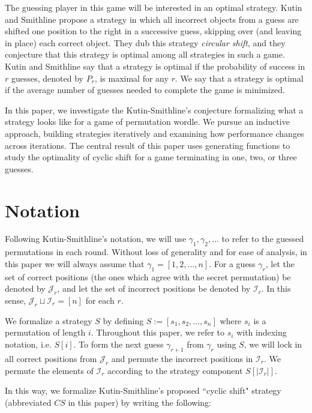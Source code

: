 \documentclass[article]{amsart}
\theoremstyle{definition}
\theoremstyle{definition}
\theoremstyle{remark}
\begin{document}
The guessing player in this game will be interested in an optimal strategy. Kutin and Smithline propose a strategy in which all incorrect objects from a guess are shifted one position to the right in a successive guess, skipping over (and leaving in place) each correct object. They dub this strategy \textit{circular shift}, and they conjecture that this strategy is optimal among all strategies in such a game. Kutin and Smithline say that a strategy is optimal if the probability of success in $r$ guesses, denoted by $P_r$, is maximal for any $r$. We say that a strategy is optimal if the average number of guesses needed to complete the game is minimized.

In this paper, we investigate the Kutin-Smithline's conjecture formalizing what a strategy looks like for a game of permutation wordle. We pursue an inductive approach, building strategies iteratively and examining how performance changes across iterations. The central result of this paper uses generating functions to study the optimality of cyclic shift for a game terminating in one, two, or three guesses.



\section{Notation} \label{sec:not}
Following Kutin-Smithline's notation, we will use $\gamma_1, \gamma_2, \dots $ to refer to the guessed permutations in each round. Without loss of generality and for ease of analysis, in this paper we will always assume that $\gamma_1 = [1,2,\dots,n]$. For a guess $\gamma_r$, let the set of correct positions (the ones which agree with the secret permutation) be denoted by $\mathcal{J}_r$, and let the set of incorrect positions be denoted by $\mathcal{I}_r$. In this sense, $\mathcal{J}_r \sqcup \mathcal{I}_r = [n]$ for each $r$.

We formalize a strategy $S$ by defining $S := [s_1, s_2, \dots, s_n]$ where $s_i$ is a permutation of length $i$. Throughout this paper, we refer to $s_i$ with indexing notation, i.e. $S[i]$. To form the next guess $\gamma_{r+1}$ from $\gamma_r$ using $S$, we will lock in all correct positions from $\mathcal{J}_r$ and permute the incorrect positions in $\mathcal{I}_r$. We permute the elements of $\mathcal{I}_r$ according to the strategy component $S[|\mathcal{I}_r|]$. 

In this way, we formalize Kutin-Smithline's proposed ``cyclic shift" strategy (abbreviated $CS$ in this paper) by writing the following:
\end{document}
